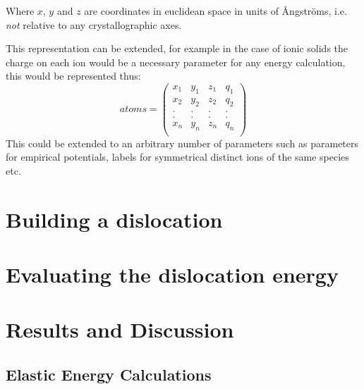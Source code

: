 Where $x$, $y$ and $z$ are coordinates in euclidean space in units of \r{A}ngstr\"{o}ms, i.e. \emph{not} relative to any crystallographic axes.

This representation can be extended, for example in the case of ionic solids the charge on each ion would be a necessary parameter for any energy calculation, this would be represented thus:
$$
atoms = \begin{pmatrix}
x_1 & y_1 & z_1 & q_1 \\
x_2 & y_2 & z_2 & q_2 \\
.   &.    &.    &.    \\
.   &.    &.    &.    \\
x_n & y_n & z_n & q_n \\
\end{pmatrix}
$$
This could be extended to an arbitrary number of parameters such as parameters for empirical potentials, labels for symmetrical distinct ions of the same species etc.





\section{Building a dislocation}
\FloatBarrier
\label{sec:build}










\section{Evaluating the dislocation energy}
\label{sec:dislocation_energy}






\section{Results and Discussion}

\subsection{Elastic Energy Calculations}

















































